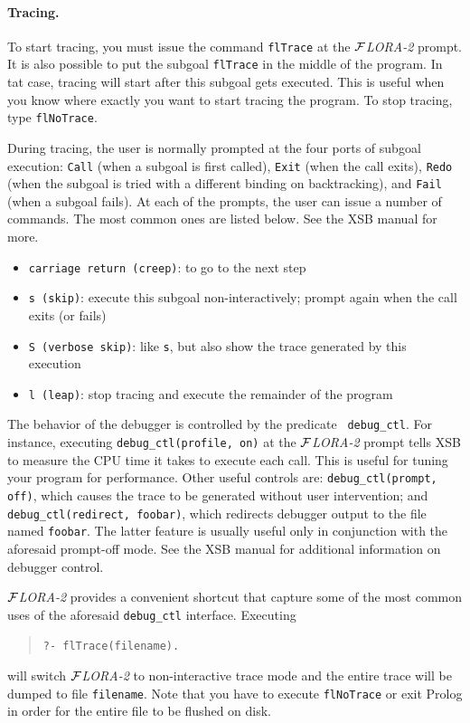 \documentclass[11pt]{article}
\newcommand{\FLORA}{{\mbox{${\cal F}${\small\it LORA}\rm\emph{-2}}}\xspace}
\begin{document}
\paragraph{Tracing.}
To start tracing, you must issue the command {\tt flTrace} at the
\FLORA prompt. It is also possible to put the subgoal {\tt flTrace} in
the middle of the program. In tat case, tracing will start after this
subgoal gets executed. This is useful when you know where exactly you want
to start tracing the program. To stop tracing, type {\tt flNoTrace}.

During tracing, the user is normally prompted at the four ports of subgoal
execution: {\tt Call} (when a subgoal is first called), {\tt Exit} (when
the call exits), {\tt Redo} (when the subgoal is tried with a different
binding on backtracking), and {\tt Fail} (when a subgoal fails).
At each of the prompts, the user can issue a number of commands. The most
common ones are listed below. See the XSB manual for more.
\begin{itemize}
  \item {\tt carriage return (creep)}:  to go to the next step  
  \item {\tt s (skip)}: execute this subgoal non-interactively; prompt
    again when the call exits (or fails)
  \item {\tt S (verbose skip)}: like {\tt s}, but also show the trace
    generated by this execution
  \item {\tt l (leap)}: stop tracing and execute the remainder of the
    program
\end{itemize}
The behavior of the debugger is controlled by the predicate {\tt
  debug\_ctl}. For instance, executing {\tt debug\_ctl(profile, on)} at the
\FLORA prompt tells XSB to measure the CPU time it takes to execute each
call. This is useful for tuning your program for performance. Other useful
controls are: {\tt debug\_ctl(prompt, off)}, which causes the trace to be
generated without user intervention; and {\tt debug\_ctl(redirect,
  foobar)}, which redirects debugger output to the file named {\tt foobar}.
The latter feature is usually useful only in conjunction with the aforesaid
prompt-off mode. See the XSB manual for additional information on debugger
control.

\FLORA provides a convenient shortcut that capture some of the most common
uses of the aforesaid {\tt debug\_ctl} interface. Executing
\begin{quote}
  {\tt ?- flTrace(filename).}
\end{quote}
will switch \FLORA to non-interactive trace mode
and the entire trace will be dumped to file {\tt filename}.
Note that you have to execute {\tt flNoTrace} or exit Prolog in order for the
entire file to be flushed on disk.
\end{document}

